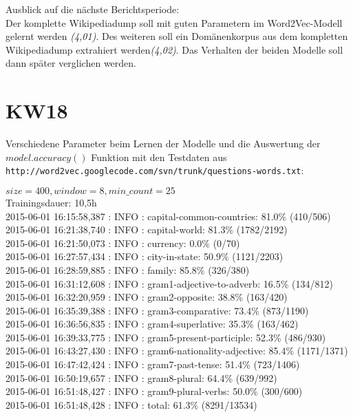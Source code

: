 \documentclass[11pt,a4paper]{article}
\begin{document}
Ausblick auf die nächste Berichtsperiode:
\\Der komplette Wikipediadump soll mit guten Parametern im Word2Vec-Modell gelernt werden \textit{(4,01)}. Des weiteren soll ein Domänenkorpus aus dem kompletten Wikipediadump extrahiert werden\textit{(4,02)}. Das Verhalten der beiden Modelle soll dann später verglichen werden.

\section*{KW18}
Verschiedene Parameter beim Lernen der Modelle und die Auswertung der $model.accuracy()$ Funktion mit den Testdaten aus
\\\texttt{http://word2vec.googlecode.com/svn/trunk/questions-words.txt}:

$size=400, window=8, min\_count=25$
\\Trainingsdauer: 10,5h
\\2015-06-01 16:15:58,387 : INFO : capital-common-countries: 81.0\% (410/506)
\\2015-06-01 16:21:38,740 : INFO : capital-world: 81.3\% (1782/2192)
\\2015-06-01 16:21:50,073 : INFO : currency: 0.0\% (0/70)
\\2015-06-01 16:27:57,434 : INFO : city-in-state: 50.9\% (1121/2203)
\\2015-06-01 16:28:59,885 : INFO : family: 85.8\% (326/380)
\\2015-06-01 16:31:12,608 : INFO : gram1-adjective-to-adverb: 16.5\% (134/812)
\\2015-06-01 16:32:20,959 : INFO : gram2-opposite: 38.8\% (163/420)
\\2015-06-01 16:35:39,388 : INFO : gram3-comparative: 73.4\% (873/1190)
\\2015-06-01 16:36:56,835 : INFO : gram4-superlative: 35.3\% (163/462)
\\2015-06-01 16:39:33,775 : INFO : gram5-present-participle: 52.3\% (486/930)
\\2015-06-01 16:43:27,430 : INFO : gram6-nationality-adjective: 85.4\% (1171/1371)
\\2015-06-01 16:47:42,424 : INFO : gram7-past-tense: 51.4\% (723/1406)
\\2015-06-01 16:50:19,657 : INFO : gram8-plural: 64.4\% (639/992)
\\2015-06-01 16:51:48,427 : INFO : gram9-plural-verbs: 50.0\% (300/600)
\\2015-06-01 16:51:48,428 : INFO : total: 61.3\% (8291/13534)
\end{document}
